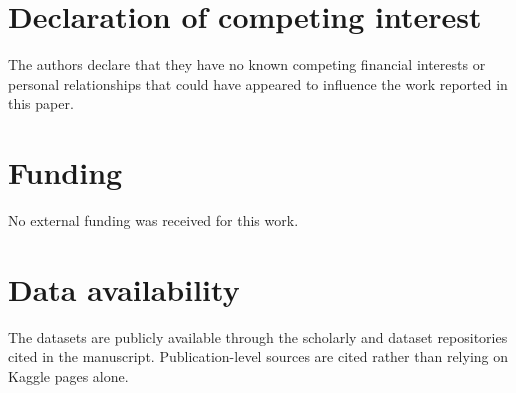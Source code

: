 \documentclass[a4paper,fleqn]{cas-dc}
\begin{document}
\section*{Declaration of competing interest}
The authors declare that they have no known competing financial interests or personal relationships that could have appeared to influence the work reported in this paper.

\section*{Funding}
No external funding was received for this work.

\section*{Data availability}
The datasets are publicly available through the scholarly and dataset repositories cited in the manuscript. Publication-level sources are cited rather than relying on Kaggle pages alone.
\end{document}
